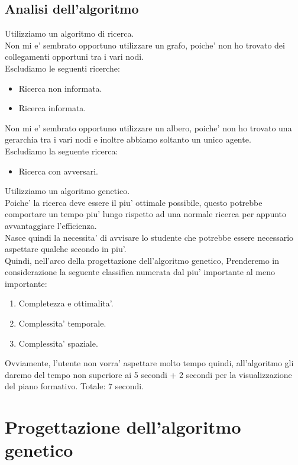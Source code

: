 \documentclass[10pt,a4paper]{article}
\begin{document}
    \subsection{Analisi dell'algoritmo}
      \label{analisiDellAlgoritmoSubsection}
      Utilizziamo un algoritmo di ricerca.\\
      Non mi e' sembrato opportuno utilizzare un grafo, poiche' non ho trovato dei collegamenti opportuni 
      tra i vari nodi.\\
      Escludiamo le seguenti ricerche:
      \begin{itemize}
        \item Ricerca non informata.
        \item Ricerca informata.
      \end{itemize}
      Non mi e' sembrato opportuno utilizzare un albero, poiche' non ho trovato una gerarchia tra i vari nodi e 
      inoltre abbiamo soltanto un unico agente.\\
      Escludiamo la seguente ricerca:
      \begin{itemize}
        \item Ricerca con avversari.
      \end{itemize}
      Utilizziamo un algoritmo genetico.\\
      Poiche' la ricerca deve essere il piu' ottimale possibile, questo 
      potrebbe comportare un tempo piu' lungo rispetto ad una normale ricerca per appunto avvantaggiare l'efficienza.\\
      Nasce quindi la necessita' di avvisare lo studente che potrebbe essere necessario aspettare qualche secondo in piu'.\\
      Quindi, nell'arco della progettazione dell'algoritmo genetico, Prenderemo in considerazione la 
      seguente classifica numerata dal piu' importante al meno importante:
      \begin{enumerate}
        \item Completezza e ottimalita'.
        \item Complessita' temporale.
        \item Complessita' spaziale.
      \end{enumerate}
      Ovviamente, l'utente non vorra' aspettare molto tempo quindi, all'algoritmo gli daremo del tempo 
      non superiore ai 5 secondi + 2 secondi per la visualizzazione del piano formativo. Totale: 7 secondi.
        
  \section{Progettazione dell'algoritmo genetico}
    \label{progettazioneDellAlgoritmoGeneticoSection}
    
\end{document}

